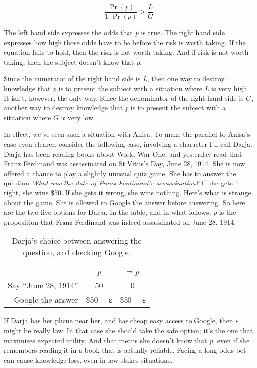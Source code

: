 \documentclass[
  12pt,
  letterpaper,
]{scrbook}
\begin{document}
\[
\frac{\Pr(\textit{p})}{1 ‑ \Pr(\textit{p})} > \frac{\textit{L}}{\textit{G}}
\]

The left hand side expresses the odds that \emph{p} is true. The right
hand side expresses how high those odds have to be before the risk is
worth taking. If the equation fails to hold, then the risk is not worth
taking. And if risk is not worth taking, then the subject doesn't know
that \emph{p}.

Since the numerator of the right hand side is \emph{L}, then one way to
destroy knowledge that \emph{p} is to present the subject with a
situation where \emph{L} is very high. It isn't, however, the only way.
Since the denominator of the right hand side is \(G\), another way to
destroy knowledge that \emph{p} is to present the subject with a
situation where \(G\) is very low.

In effect, we've seen such a situation with Anisa. To make the parallel
to Anisa's case even clearer, consider the following case, involving a
character I'll call Darja. Darja has been reading books about World War
One, and yesterday read that Franz Ferdinand was assassinated on St
Vitus's Day, June 28, 1914. She is now offered a chance to play a
slightly unusual quiz game. She has to answer the question \emph{What
was the date of Franz Ferdinand's assassination?} If she gets it right,
she wins \$50. If she gets it wrong, she wins nothing. Here's what is
strange about the game. She is allowed to Google the answer before
answering. So here are the two live options for Darja. In the table, and
in what follows, \emph{p} is the proposition that Franz Ferdinand was
indeed assassinated on June 28, 1914.

\begin{longtable}[]{@{}rcc@{}}
\caption{Darja's choice between answering the question, and checking
Google.}\label{tbl-google}\tabularnewline
\toprule\noalign{}
\endfirsthead
\endhead
\bottomrule\noalign{}
\endlastfoot
~ & \emph{p} & ¬ \emph{p} \\
Say ``June 28, 1914'' & 50 & 0 \\
Google the answer & \$50~‑~ε & \$50~‑~ε \\
\end{longtable}

If Darja has her phone near her, and has cheap easy access to Google,
then ε might be really low. In that case she should take the safe
option; it's the one that maximises expected utility. And that means she
doesn't know that \emph{p}, even if she remembers reading it in a book
that is actually reliable. Facing a long odds bet can cause knowledge
loss, even in low stakes situations.
\end{document}
